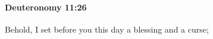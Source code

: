 
		\paragraph{Deuteronomy 11:26} %
			\label{DEUTERONOMY-11-26}

			Behold, I set before you this day a blessing and a curse;


